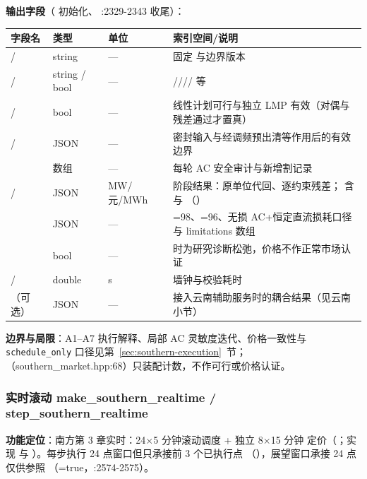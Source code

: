 \textbf{输出字段}（ 初始化、
:2329-2343 收尾）：
\begin{center}\footnotesize
\begin{longtable}{@{}L{4.6cm}L{3.4cm}L{1.7cm}L{5.6cm}@{}}
\toprule 字段名 & 类型 & 单位 & 索引空间/说明\\\midrule
\endhead
{} /  & string & — & 固定  与边界版本\\
 /  & string / bool & — & //// 等\\
 /  & bool & — & 线性计划可行与独立 LMP 有效（对偶与残差通过才置真）\\
 /  & JSON & — & 密封输入与经调频预出清等作用后的有效边界\\
 & 数组 & — & 每轮 AC 安全审计与新增割记录\\
 /  & JSON & MW/\allowbreak 元/\allowbreak MWh & 阶段结果：原单位代回、逐约束残差； 含  与 （）\\
 & JSON & — & =98、=96、无损 AC+恒定直流损耗口径与 limitations 数组\\
 & bool & — &  时为研究诊断松弛，价格不作正常市场认证\\
 /  & double & s & 墙钟与校验耗时\\
（可选） & JSON & — & 接入云南辅助服务时的耦合结果（见云南小节）\\
\bottomrule
\end{longtable}
\end{center}

\textbf{边界与局限}：A1--A7 执行解释、局部 AC 灵敏度迭代、价格一致性与
\texttt{schedule\_only} 口径见第~\ref{sec:southern-execution}~节；
（southern\_market.hpp:68）只装配计数，不作可行或价格认证。

\subsubsection{实时滚动 make\_southern\_realtime / step\_southern\_realtime}
\textbf{功能定位}：南方第 3 章实时：24$\times$5 分钟滚动调度 + 独立 8$\times$15 分钟
定价（；实现
 与
）。每步执行 24 点窗口但只承接前 3 个已执行点
（），展望窗口承接 24 点仅供参照
（=true，:2574-2575）。

